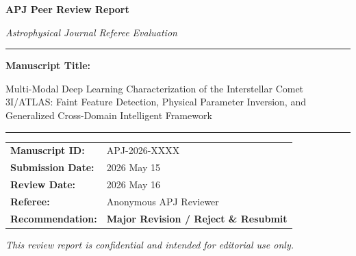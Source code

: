 \documentclass[12pt,a4paper]{article}
\newcommand{\critical}[1]{\textcolor{CriticalRed}{\textbf{#1}}}
\begin{document}
\begin{titlepage}
\centering
\vspace*{2cm}

{\Huge\bfseries\textcolor{HeaderBlue}{APJ Peer Review Report}}

\vspace{1cm}

{\Large\textit{Astrophysical Journal Referee Evaluation}}

\vspace{2cm}

\rule{\textwidth}{1pt}

\vspace{0.5cm}

{\Large\textbf{Manuscript Title:}}

\vspace{0.3cm}

{\large Multi-Modal Deep Learning Characterization of the Interstellar Comet 3I/ATLAS:
Faint Feature Detection, Physical Parameter Inversion, and Generalized Cross-Domain Intelligent Framework}

\vspace{0.5cm}

\rule{\textwidth}{1pt}

\vspace{2cm}

\begin{tabular}{ll}
\textbf{Manuscript ID:} & APJ-2026-XXXX \\[0.3cm]
\textbf{Submission Date:} & 2026 May 15 \\[0.3cm]
\textbf{Review Date:} & 2026 May 16 \\[0.3cm]
\textbf{Referee:} & Anonymous APJ Reviewer \\[0.3cm]
\textbf{Recommendation:} & \critical{Major Revision / Reject \& Resubmit}
\end{tabular}

\vspace{2cm}

\begin{center}
\end{center}

\vfill

{\small\textit{This review report is confidential and intended for editorial use only.}}

\end{titlepage}
\end{document}
